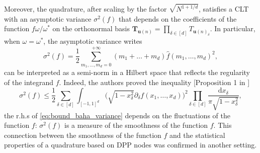 \documentclass[twoside,11pt]{book}
\newtheorem{theorem}{Theorem}
\numberwithin{theorem}{chapter}
\numberwithin{definition}{chapter}
\numberwithin{proposition}{chapter}
\numberwithin{corollary}{chapter}
\numberwithin{example}{chapter}
\numberwithin{lemma}{chapter}
\begin{document}
 Moreover, the quadrature, after scaling by the factor $\sqrt{N^{1+1/d}}$, satisfies a CLT with an asymptotic variance $\sigma^{2}(f)$ that depends on the coefficients of the function $\displaystyle f \omega / \omega^{*}$ on the orthonormal basis $\bm{T}_{\bm{u}(n)} = \prod\limits_{ \delta \in [d]} T_{\bm{u}(n)_{\delta}}$. In particular, when $\omega = \omega^{*}$, the asymptotic variance writes
\begin{equation}
\sigma^{2}(f) = \frac{1}{2} \sum\limits_{m_{1}, \dots , m_{d} = 0}^{+\infty} (m_{1}+\dots +m_{d}) \widehat{f} (m_{1}, \dots, m_{d})^{2},
\end{equation}
can be interpreted as a semi-norm in a Hilbert space that reflects the regularity of the integrand $f$. Indeed, the authors proved the inequality [Proposition 1 in \citep{BaHa16}]
\begin{equation}\label{eq:bound_baha_variance}
\sigma^{2}(f) \leq \frac{1}{2} \sum\limits_{\delta \in [d]} \int_{[-1,1]^{d}} \bigg(\sqrt{1-x_{\delta}^{2}} \partial_{\delta}f(x_{1}, \dots,x_{d}) \bigg)^{2} \prod\limits_{\delta \in [d]} \frac{\mathrm{d}x_{\delta}}{\pi \sqrt{1-x_{\delta}^{2}}},
\end{equation}
the r.h.s of \eqref{eq:bound_baha_variance} depends on the fluctuations of the function $f$: $\sigma^{2}(f)$ is a measure of the smoothness of the function $f$. This connection between the smoothness of the function $f$ and the statistical properties of a quadrature based on DPP nodes was confirmed in another setting.









\end{document}
